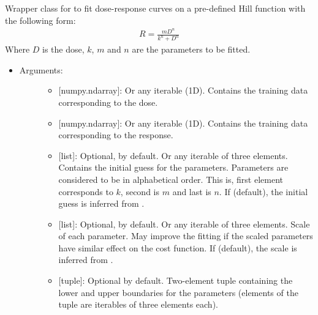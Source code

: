 \documentclass[letterpaper,10pt,english]{sphinxmanual}
\begin{document}
\begin{fulllineitems}
\label{\detokenize{models:data_tools.models.DoseResponse}}
Wrapper class for  to fit
dose-response curves on a pre-defined Hill function with the
following form:
\begin{equation*}
\begin{split}R=\frac{mD^n}{k^n+D^n}\end{split}
\end{equation*}
Where \(D\) is the dose, \(k\), \(m\) and \(n\) are
the parameters to be fitted.
\begin{itemize}
\item {} \begin{description}
\item[{Arguments:}] \leavevmode\begin{itemize}
\item {} 
 {[}numpy.ndarray{]}: Or any iterable (1D). Contains the
training data corresponding to the dose.

\item {} 
 {[}numpy.ndarray{]}: Or any iterable (1D). Contains the
training data corresponding to the response.

\item {} 
 {[}list{]}: Optional,  by default. Or any
iterable of three elements. Contains the initial guess for the
parameters. Parameters are considered to be in alphabetical
order. This is, first element corresponds to \(k\), second
is \(m\) and last is \(n\). If  (default), the
initial guess is inferred from .

\item {} 
 {[}list{]}: Optional,  by default. Or any
iterable of three elements. Scale of each parameter. May
improve the fitting if the scaled parameters have similar
effect on the cost function. If  (default), the scale
is inferred from .

\item {} 
 {[}tuple{]}: Optional 
by default. Two-element tuple containing the lower and upper
boundaries for the parameters (elements of the tuple are
iterables of three elements each).


\end{itemize}
\end{description}
\end{itemize}
\end{fulllineitems}
\end{document}
